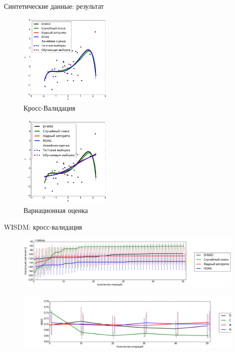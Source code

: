 \documentclass[11pt,pdf,utf8,russian,aspectratio=169]{beamer}
\begin{document}
\begin{frame}{Синтетические данные: результат}
\begin{multicols}{2}
\begin{figure}[h]
\includegraphics[width=0.4\textwidth]{./slide_plots/poly_cv.png}
\caption*{Кросс-Валидация}
\end{figure}

\begin{figure}[h]
\includegraphics[width=0.4\textwidth]{./slide_plots/poly_var.png}
\caption*{Вариационная оценка}
\end{figure}
\end{multicols}

\end{frame}


\begin{frame}{WISDM: кросс-валидация}
\begin{figure}[h]
\includegraphics[width=\textwidth]{./slide_plots/wisdm_q_cv.png}
\end{figure}
\begin{figure}[h]
\includegraphics[width=\textwidth]{./slide_plots/wisdm_e_cv.png}
\end{figure}
\end{frame}
\end{document}
